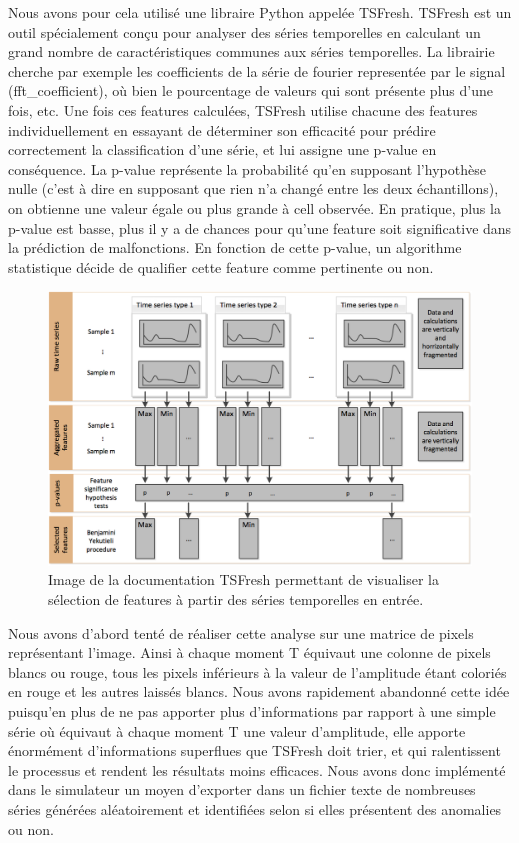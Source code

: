 \documentclass[french]{article}
\theoremstyle{mytheoremstyle}
\theoremstyle{mytheoremstyle}
\theoremstyle{myproblemstyle}
\begin{document}
        Nous avons pour cela utilisé une libraire Python appelée TSFresh. TSFresh est un outil spécialement conçu pour analyser des séries temporelles en calculant un grand nombre de caractéristiques communes aux séries temporelles\cite{tsfreshfeatures}. La librairie cherche par exemple les coefficients de la série de fourier representée par le signal (fft\_coefficient), où bien le pourcentage de valeurs qui sont présente plus d'une fois, etc. Une fois ces features calculées, TSFresh utilise chacune des features individuellement en essayant de déterminer son efficacité pour prédire correctement la classification d'une série, et lui assigne une p-value en conséquence. La p-value représente la probabilité qu'en supposant l'hypothèse nulle (c'est à dire en supposant que rien n'a changé entre les deux échantillons), on obtienne une valeur égale ou plus grande à cell observée. En pratique, plus la p-value est basse, plus il y a de chances pour qu'une feature soit significative dans la prédiction de malfonctions. En fonction de cette p-value, un algorithme statistique décide de qualifier cette feature comme pertinente ou non.
        
        \begin{figure}[H]
            \centering
            \includegraphics[width=.8\textwidth]{images/features_extraction.png}
            \caption{Image de la documentation TSFresh permettant de visualiser la sélection de features à partir des séries temporelles en entrée.}
            \label{}
        \end{figure}
        
      
        Nous avons d'abord tenté de réaliser cette analyse sur une matrice de pixels représentant l'image. Ainsi à chaque moment T équivaut une colonne de pixels blancs ou rouge, tous les pixels inférieurs à la valeur de l'amplitude étant coloriés en rouge et les autres laissés blancs. Nous avons rapidement abandonné cette idée puisqu'en plus de ne pas apporter plus d'informations par rapport à une simple série où équivaut à chaque moment T une valeur d'amplitude, elle apporte énormément d'informations superflues que TSFresh doit trier, et qui ralentissent le processus et rendent les résultats moins efficaces. Nous avons donc implémenté dans le simulateur un moyen d'exporter dans un fichier texte de nombreuses séries générées aléatoirement et identifiées selon si elles présentent des anomalies ou non.
        
\end{document}

